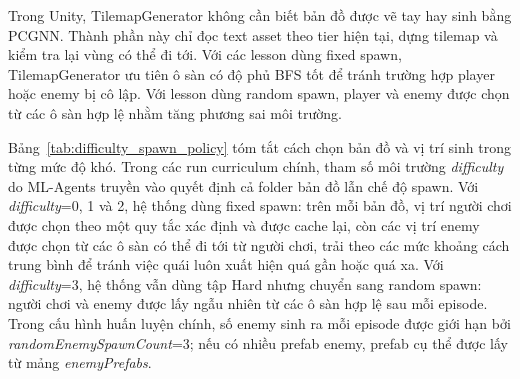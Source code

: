 Trong Unity, TilemapGenerator không cần biết bản đồ được vẽ tay hay sinh bằng PCGNN. Thành phần này chỉ đọc text asset theo tier hiện tại, dựng tilemap và kiểm tra lại vùng có thể đi tới. Với các lesson dùng fixed spawn, TilemapGenerator ưu tiên ô sàn có độ phủ BFS tốt để tránh trường hợp player hoặc enemy bị cô lập. Với lesson dùng random spawn, player và enemy được chọn từ các ô sàn hợp lệ nhằm tăng phương sai môi trường.

Bảng~\ref{tab:difficulty_spawn_policy} tóm tắt cách chọn bản đồ và vị trí sinh trong từng mức độ khó. Trong các run curriculum chính, tham số môi trường \emph{difficulty} do ML-Agents truyền vào quyết định cả folder bản đồ lẫn chế độ spawn. Với \emph{difficulty}=0, 1 và 2, hệ thống dùng fixed spawn: trên mỗi bản đồ, vị trí người chơi được chọn theo một quy tắc xác định và được cache lại, còn các vị trí enemy được chọn từ các ô sàn có thể đi tới từ người chơi, trải theo các mức khoảng cách trung bình để tránh việc quái luôn xuất hiện quá gần hoặc quá xa. Với \emph{difficulty}=3, hệ thống vẫn dùng tập Hard nhưng chuyển sang random spawn: người chơi và enemy được lấy ngẫu nhiên từ các ô sàn hợp lệ sau mỗi episode. Trong cấu hình huấn luyện chính, số enemy sinh ra mỗi episode được giới hạn bởi \emph{randomEnemySpawnCount}=3; nếu có nhiều prefab enemy, prefab cụ thể được lấy từ mảng \emph{enemyPrefabs}.

\begin{table}[H]
    \centering
    \small
    \caption{Chính sách chọn map và spawn theo tham số \emph{difficulty}}
    \label{tab:difficulty_spawn_policy}
\end{table}

